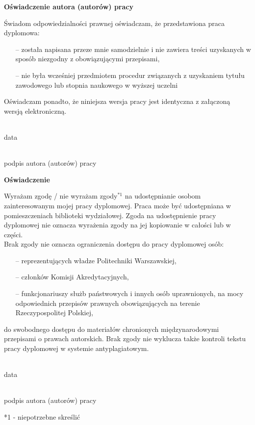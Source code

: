 \thispagestyle{empty}
\begingroup
\fontsize{11pt}{13pt}\selectfont
\begin{center}
\textbf{Oświadczenie autora (autorów) pracy}
\end{center}

Świadom odpowiedzialności prawnej oświadczam, że przedstawiona praca dyplomowa:
\begin{itemize}
	\item[--] została napisana przeze mnie samodzielnie i nie zawiera treści uzyskanych w sposób niezgodny z obowiązującymi przepisami,
	\item[--] nie była wcześniej przedmiotem procedur związanych z uzyskaniem tytułu zawodowego lub stopnia naukowego w wyższej uczelni
\end{itemize}

Oświadczam ponadto, że niniejsza wersja pracy jest identyczna z załączoną wersją elektroniczną.

\vspace{2cm}
\fontsize{7pt}{8pt}\selectfont
  \parbox{\textwidth}{	
  	\parbox{7cm}{
  		\centering
  		\hdashrule{5cm}{1pt}{1pt}\\
  		data 
  	}\hfill
  	\parbox{7cm}{
  		\centering
  		\hdashrule{5cm}{1pt}{1pt}\\
  		podpis autora (autorów) pracy
  	}
  }

\vspace{2cm}
\fontsize{11pt}{13pt}\selectfont
\begin{center}
	\textbf{Oświadczenie}
\end{center}

Wyrażam zgodę / nie wyrażam zgody$^{*1}$ na udostępnianie osobom zainteresowanym mojej pracy dyplomowej. Praca może być udostępniana w pomieszczeniach biblioteki wydziałowej. Zgoda na udostępnienie pracy dyplomowej nie oznacza wyrażenia zgody na jej kopiowanie w całości lub w części. \\
Brak zgody nie oznacza ograniczenia dostępu do pracy dyplomowej osób:
\begin{itemize}
	\item[--] reprezentujących władze Politechniki Warszawskiej,
	\item[--] członków Komisji Akredytacyjnych,
	\item[--] funkcjonariuszy służb państwowych i innych osób uprawnionych, na mocy odpowiednich przepisów prawnych obowiązujących na terenie Rzeczypospolitej Polskiej,
\end{itemize}
do swobodnego dostępu do materiałów chronionych międzynarodowymi przepisami o prawach autorskich. Brak zgody nie wyklucza także kontroli tekstu pracy dyplomowej w systemie antyplagiatowym. 

\vspace{2cm}
\fontsize{7pt}{8pt}\selectfont
\parbox{\textwidth}{	
	\parbox{7cm}{
		\centering
		\hdashrule{5cm}{1pt}{1pt}\\
		data 
	}\hfill
	\parbox{7cm}{
		\centering
		\hdashrule{5cm}{1pt}{1pt}\\
		podpis autora (autorów) pracy
	}
}

\vspace{2cm}
*1 - niepotrzebne skreślić

\endgroup